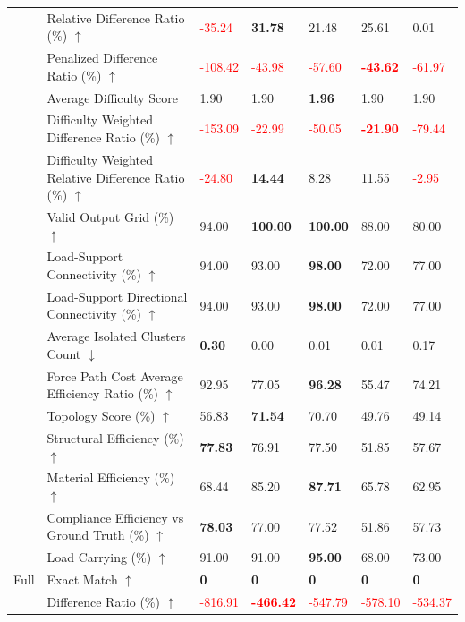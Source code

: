 \begin{table}[!h]
{\begin{tabular}{lllllll}
 & Relative Difference Ratio (\%) $\uparrow$ & \textcolor{red}{-35.24} & \textbf{31.78} & 21.48 & 25.61 & 0.01 \\
 & Penalized Difference Ratio (\%) $\uparrow$ & \textcolor{red}{-108.42} & \textcolor{red}{-43.98} & \textcolor{red}{-57.60} & \textbf{\textcolor{red}{-43.62}} & \textcolor{red}{-61.97} \\
 & Average Difficulty Score & 1.90 & 1.90 & \textbf{1.96} & 1.90 & 1.90 \\
 & Difficulty Weighted Difference Ratio (\%) $\uparrow$ & \textcolor{red}{-153.09} & \textcolor{red}{-22.99} & \textcolor{red}{-50.05} & \textbf{\textcolor{red}{-21.90}} & \textcolor{red}{-79.44} \\
 & Difficulty Weighted Relative Difference Ratio (\%) $\uparrow$ & \textcolor{red}{-24.80} & \textbf{14.44} & 8.28 & 11.55 & \textcolor{red}{-2.95} \\
 & Valid Output Grid (\%) $\uparrow$ & 94.00 & \textbf{100.00} & \textbf{100.00} & 88.00 & 80.00 \\
 & Load-Support Connectivity (\%) $\uparrow$ & 94.00 & 93.00 & \textbf{98.00} & 72.00 & 77.00 \\
 & Load-Support Directional Connectivity (\%) $\uparrow$ & 94.00 & 93.00 & \textbf{98.00} & 72.00 & 77.00 \\
 & Average Isolated Clusters Count $\downarrow$ & \textbf{0.30} & 0.00 & 0.01 & 0.01 & 0.17 \\
 & Force Path Cost Average Efficiency Ratio (\%) $\uparrow$ & 92.95 & 77.05 & \textbf{96.28} & 55.47 & 74.21 \\
 & Topology Score (\%) $\uparrow$ & 56.83 & \textbf{71.54} & 70.70 & 49.76 & 49.14 \\
 & Structural Efficiency (\%) $\uparrow$ & \textbf{77.83} & 76.91 & 77.50 & 51.85 & 57.67 \\
 & Material Efficiency (\%) $\uparrow$ & 68.44 & 85.20 & \textbf{87.71} & 65.78 & 62.95 \\
 & Compliance Efficiency vs Ground Truth (\%) $\uparrow$ & \textbf{78.03} & 77.00 & 77.52 & 51.86 & 57.73 \\
 & Load Carrying (\%) $\uparrow$ & 91.00 & 91.00 & \textbf{95.00} & 68.00 & 73.00 \\
Full & Exact Match $\uparrow$ & \textbf{0} & \textbf{0} & \textbf{0} & \textbf{0} & \textbf{0} \\
 & Difference Ratio (\%) $\uparrow$ & \textcolor{red}{-816.91} & \textbf{\textcolor{red}{-466.42}} & \textcolor{red}{-547.79} & \textcolor{red}{-578.10} & \textcolor{red}{-534.37} \\

\end{tabular}}
\end{table}
